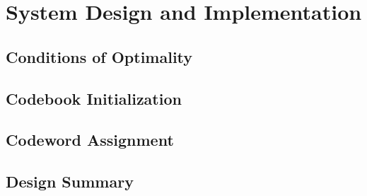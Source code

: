 \documentclass[10pt]{article}
\begin{document}
\section{System Design and Implementation}
\subsection{Conditions of Optimality}



\subsection{Codebook Initialization}


\subsection{Codeword Assignment}

\subsection{Design Summary}
\end{document}
